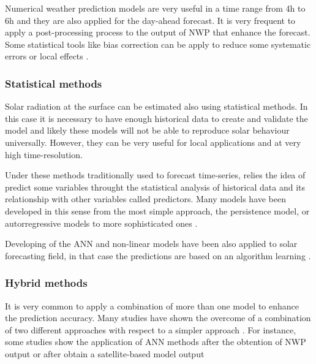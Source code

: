 Numerical weather prediction models are very useful in a time range from 4h to 6h and they are also applied for the day-ahead forecast. It is very frequent to apply a post-processing process to the output of NWP that enhance the forecast. Some statistical tools like bias correction can be apply to reduce some systematic errors or local effects \cite*{Diagne2013}.

\subsubsection{Statistical methods}

Solar radiation at the surface can be estimated also using statistical methods. In this case it is necessary to have enough historical data to create and validate the model and likely these models will not be able to reproduce solar behaviour universally. However, they can be very useful for local applications and at very high time-resolution.

Under these methods traditionally used to forecast time-series, relies the idea of predict some variables throught the statistical analysis of historical data and its relationship with other variables called predictors. Many models have been developed in this sense from the most simple approach, the persistence model, or autorregressive models to more sophisticated ones \cite*{Reikard2009, bacher2009, Inman2013}. 

Developing of the ANN and non-linear models have been also applied to solar forecasting field, in that case the predictions are based on an algorithm learning \cite{Mellit2008}. 


\subsubsection{Hybrid methods}

It is very common to apply a combination of more than one model to enhance the prediction accuracy. Many studies have shown the overcome of a combination of two different approaches with respect to a simpler approach \cite*{Diagne2017, Yang2014}. For instance, some studies show the application of ANN methods after the obtention of NWP output \cite*{Cornaro2015} or after obtain a satellite-based model output \cite*{Marquez2013}\\ 

